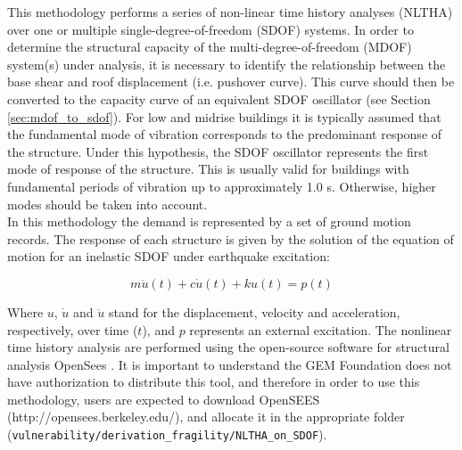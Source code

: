 This methodology performs a series of non-linear time history analyses (NLTHA) over one or multiple single-degree-of-freedom (SDOF) systems. In order to determine the structural capacity of the multi-degree-of-freedom (MDOF) system(s) under analysis, it is necessary to identify the relationship between the base shear and roof displacement (i.e. pushover curve). This curve should then be converted to the capacity curve of an equivalent SDOF oscillator (see Section \ref{sec:mdof_to_sdof}). For low and midrise buildings it is typically assumed that the fundamental mode of vibration corresponds to the predominant response of the structure. Under this hypothesis, the SDOF oscillator represents the first mode of response of the structure. This is usually valid for buildings with fundamental periods of vibration up to approximately 1.0 s. Otherwise, higher modes should be taken into account.\\

In this methodology the demand is represented by a set of ground motion records. The response of each structure is given by the solution of the equation of motion for an inelastic SDOF under earthquake excitation:

\begin{equation}
m\ddot{u}(t) + c\dot{u}(t) + ku(t) = p(t)
\end{equation}

Where $u$, $\dot{u}$ and $\ddot{u}$ stand for the displacement, velocity and acceleration, respectively, over time ($t$), and $p$ represents an external excitation. The nonlinear time history analysis are performed using the open-source software for structural analysis OpenSees \citep{McKennaEtAl2000}. It is important to understand the GEM Foundation does not have authorization to distribute this tool, and therefore in order to use this methodology, users are expected to download OpenSEES (http://opensees.berkeley.edu/), and allocate it in the appropriate folder (\verb=vulnerability/derivation_fragility/NLTHA_on_SDOF=).\\

